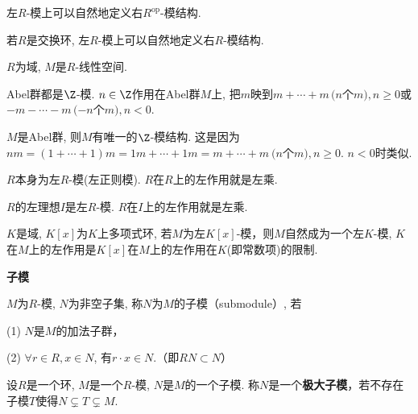     \begin{proposition}
        左$R$-模上可以自然地定义右$R^{\operatorname{op}}$-模结构.\par
       \qquad 若$R$是交换环, 左$R$-模上可以自然地定义右$R$-模结构.
    \end{proposition}
		
	\begin{example}
		$R$为域, $M$是$R$-线性空间.
	\end{example}
	
	\begin{example}
		Abel群都是$\Z$-模. $n\in\Z$作用在Abel群$M$上, 
        把$m$映到$m+\cdots+m\,(n$个$m),n\geq0$或$-m-\cdots-m\,(-n$个$m),n<0$.
	\end{example}
	
	\begin{proposition} 
        $M$是Abel群, 则$M$有唯一的$\Z$-模结构. 这是因为
        $nm=(1+\cdots+1)m=1m+\cdots+1m=m+\cdots+m\ (n$个$m),n\geq0$. $n<0$时类似.
	\end{proposition}
	
	\begin{example}
		$R$本身为左$R$-模(左正则模). $R$在$R$上的左作用就是左乘.
	\end{example}

    \begin{example}
        $R$的左理想$I$是左$R$-模. $R$在$I$上的左作用就是左乘.
    \end{example}
		
	\begin{example}
		$K$是域, $K[x]$为$K$上多项式环, 若$M$为左$K[x]$-模，则$M$自然成为一个左$K$-模, $K$在$M$上的左作用是$K[x]$在$M$上的左作用在$K$(即常数项)的限制.
	\end{example}
		
	\begin{definition} \textbf{子模}\par
		$M$为$R$-模, $N$为非空子集, 称$N$为$M$的子模（submodule）, 若\par
			\qquad (1) $N$是$M$的加法子群，\par
			\qquad(2) $\forall r\in R, x\in N$, 有$r\cdot x\in N$.（即$RN\subset N$）
	\end{definition}

    \begin{definition}
        设$R$是一个环, $M$是一个$R$-模, $N$是$M$的一个子模.
        称$N$是一个\textbf{极大子模}，若不存在子模$T$使得$N\subsetneq T\subsetneq M$.\par
    \end{definition}

